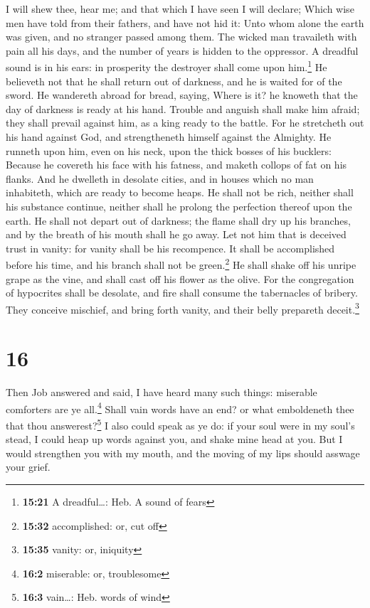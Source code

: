  I will shew thee, hear me; and that which I have seen I
will declare;  Which wise men have told from their
fathers, and have not hid it:  Unto whom alone the earth
was given, and no stranger passed among them.  The wicked
man travaileth with pain all his days, and the number of years is hidden
to the oppressor.  A dreadful sound is in his ears: in
prosperity the destroyer shall come upon him.\footnote{\textbf{15:21} A
  dreadful\ldots: Heb. A sound of fears}  He believeth
not that he shall return out of darkness, and he is waited for of the
sword.  He wandereth abroad for bread, saying, Where is
it? he knoweth that the day of darkness is ready at his hand.
 Trouble and anguish shall make him afraid; they shall
prevail against him, as a king ready to the battle.  For
he stretcheth out his hand against God, and strengtheneth himself
against the Almighty.  He runneth upon him, even on his
neck, upon the thick bosses of his bucklers:  Because he
covereth his face with his fatness, and maketh collops of fat on his
flanks.  And he dwelleth in desolate cities, and in
houses which no man inhabiteth, which are ready to become heaps.
 He shall not be rich, neither shall his substance
continue, neither shall he prolong the perfection thereof upon the
earth.  He shall not depart out of darkness; the flame
shall dry up his branches, and by the breath of his mouth shall he go
away.  Let not him that is deceived trust in vanity: for
vanity shall be his recompence.  It shall be accomplished
before his time, and his branch shall not be green.\footnote{\textbf{15:32}
  accomplished: or, cut off}  He shall shake off his
unripe grape as the vine, and shall cast off his flower as the olive.
 For the congregation of hypocrites shall be desolate,
and fire shall consume the tabernacles of bribery.  They
conceive mischief, and bring forth vanity, and their belly prepareth
deceit.\footnote{\textbf{15:35} vanity: or, iniquity}

\hypertarget{section-15}{%
\section{16}\label{section-15}}

 Then Job answered and said,  I have heard
many such things: miserable comforters are ye all.\footnote{\textbf{16:2}
  miserable: or, troublesome}  Shall vain words have an
end? or what emboldeneth thee that thou answerest?\footnote{\textbf{16:3}
  vain\ldots: Heb. words of wind}  I also could speak as
ye do: if your soul were in my soul's stead, I could heap up words
against you, and shake mine head at you.  But I would
strengthen you with my mouth, and the moving of my lips should asswage
your grief.

